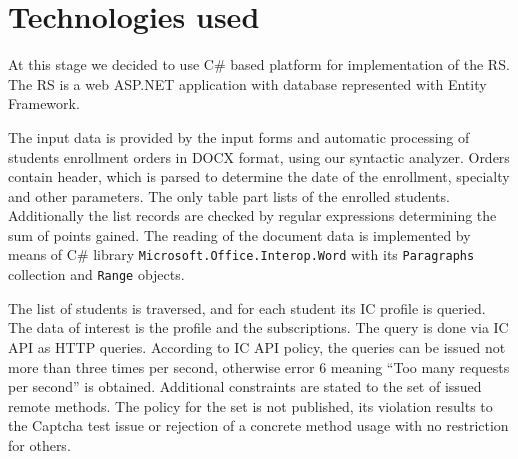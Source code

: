 \documentclass[conference]{IEEEtran}
\begin{document}




\section{Technologies used}
\label{sec:tech}

At this stage we decided to use C\# based platform for implementation of the RS.  The RS is a web ASP.NET application with database represented with Entity Framework.

The input data is provided by the input forms and automatic processing of students enrollment orders in DOCX format, using our syntactic analyzer.  Orders contain header, which is parsed to determine the date of the enrollment, specialty and other parameters.  The only table part lists of the enrolled students.  Additionally the list records are checked by regular expressions determining the sum of points gained.  The reading of the document data is implemented by means of C\# library \texttt{Microsoft.Office.Interop.Word} with its \texttt{Paragraphs} collection and \texttt{Range} objects.

The list of students is traversed, and for each student its IC profile is queried.  The data of interest is the profile and the subscriptions.  The query is done via IC API as HTTP queries.  According to IC API policy, the queries can be issued not more than three times per second, otherwise error 6 meaning ``Too many requests per second'' is obtained.  Additional constraints are stated to the set of issued remote methods.  The policy for the set is not published, its violation results to the Captcha test issue or rejection of a concrete method usage with no restriction for others.
\end{document}
